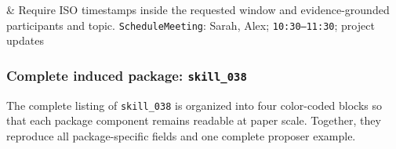 \begin{table}[htbp]
\begin{tabular*}{\textwidth}
        & Require ISO timestamps inside the requested window and evidence-grounded participants and topic.\newline
        \texttt{ScheduleMeeting}: Sarah, Alex; \texttt{10:30--11:30}; project updates \\
        \bottomrule
    \end{tabular*}
    \caption{\textbf{Tool-call case studies from the induced skill library.} All packages were created from self-play trajectories and saved with \texttt{source=skill\_induction}. Each package binds prior evidence to a next-action rule and checks that the resulting call remains grounded and schema-valid. The final line in each row compactly renders the verified call from its package example; $\mathrm{filtered}/\mathrm{routed}$ reports the package statistics accumulated during routing.}
    \label{tab:toolcall_skill_cases}
\end{table}

\subsubsection{Complete induced package: \texttt{skill\_038}}
\label{app:complete_toolcall_skill}

The complete listing of \texttt{skill\_038} is organized into four color-coded blocks so that each package component remains readable at paper scale. Together, they reproduce all package-specific fields and one complete proposer example.

\newcommand{\skillcaseband}[2]{%
    \begingroup
    \setlength{\fboxsep}{4.5pt}%
    \noindent\colorbox[rgb]{#1}{\parbox{\dimexpr\linewidth-2\fboxsep\relax}{\small\textbf{#2}}}\par
    \endgroup
}


